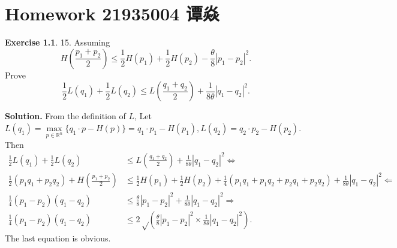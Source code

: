 \documentclass[a4paper]{book}
\makeatletter
\newenvironment{solution}%
{\noindent\textbf{Solution.}}%
{\qedhere}
\newcommand{\voidenvironment}[1]{%
  \expandafter\providecommand\csname env@#1@save@env\endcsname{}%
  \expandafter\providecommand\csname env@#1@process\endcsname{}%
  \@ifundefined{#1}{}{\RenewEnviron{#1}{}}%
}
\numberwithin{equation}{chapter}
\theoremstyle{definition}
\newtheorem{exc}[exm]{Exercise}
\makeatother
\begin{document}
\pagestyle{empty}
% 



\setcounter{chapter}{7}




\chapter{Homework 21935004 谭焱}



\begin{exc}
  15.  Assuming %
  \[H(\frac{p_1 + p_2}{2}) \leq \frac{1}{2}H(p_1) + \frac{1}{2}H(p_2) - \frac{\theta}{8}\left| p_1 - p_2 \right|^2.\]
  Prove
  \[\frac{1}{2}L(q_1) + \frac{1}{2}L(q_2) \leq L(\frac{q_1 + q_2}{2}) + \frac{1}{8 \theta} \left| q_1 - q_2 \right|^2.\]
\end{exc}

\begin{solution}
  From the definition of $L$, Let $L(q_1) = \max\limits_{p \in \mathbb{R}^n}\{q_1 \cdot p - H(p)\} = q_1 \cdot p_1 - H(p_1), L(q_2) = q_2 \cdot p_2 - H(p_2)$. Then
  \begin{align*}
    \frac{1}{2}L(q_1) + \frac{1}{2}L(q_2) &\leq L(\frac{q_1 + q_2}{2}) + \frac{1}{8 \theta} \left| q_1 - q_2 \right|^2  \Longleftrightarrow \\
    \frac{1}{2}(p_1q_1 + p_2q_2) + H(\frac{p_1 + p_2}{2}) &\leq \frac{1}{2}H(p_1) + \frac{1}{2}H(p_2) + \frac{1}{4}(p_1q_1 + p_1q_2 + p_2q_1 + p_2q_2) +  \frac{1}{8 \theta} \left| q_1 - q_2 \right|^2 \Longleftarrow \\
    \frac{1}{4}(p_1 - p_2)(q_1 - q_2) &\leq \frac{\theta}{8}\left| p_1 - p_2 \right|^2 + \frac{1}{8 \theta} \left| q_1 - q_2 \right|^2 \Longrightarrow \\
    \frac{1}{4}(p_1 - p_2)(q_1 - q_2) &\leq 2 \sqrt\left({\frac{\theta}{8}\left| {p_1 - p_2} \right|^2 \times \frac{1}{8 \theta} \left| {q_1 - q_2} \right|^2} \right).
  \end{align*}
  The last equation is obvious.
\end{solution}
\end{document}
